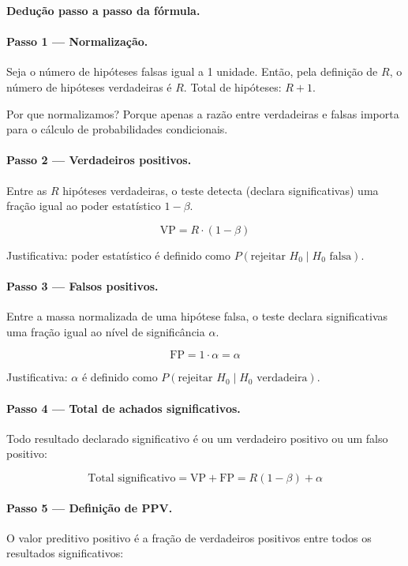\begin{metodo}
\textbf{Dedução passo a passo da fórmula.}

\paragraph{Passo 1 — Normalização.}
Seja o número de hipóteses falsas igual a 1 unidade. Então, pela definição de $R$, o número de hipóteses verdadeiras é $R$. Total de hipóteses: $R + 1$.

Por que normalizamos? Porque apenas a razão entre verdadeiras e falsas importa para o cálculo de probabilidades condicionais.

\paragraph{Passo 2 — Verdadeiros positivos.}
Entre as $R$ hipóteses verdadeiras, o teste detecta (declara significativas) uma fração igual ao poder estatístico $1-\beta$.

\[
\text{VP} = R \cdot (1-\beta)
\]

Justificativa: poder estatístico é definido como $P(\text{rejeitar } H_0 \mid H_0 \text{ falsa})$.

\paragraph{Passo 3 — Falsos positivos.}
Entre a massa normalizada de uma hipótese falsa, o teste declara significativas uma fração igual ao nível de significância $\alpha$.

\[
\text{FP} = 1 \cdot \alpha = \alpha
\]

Justificativa: $\alpha$ é definido como $P(\text{rejeitar } H_0 \mid H_0 \text{ verdadeira})$.

\paragraph{Passo 4 — Total de achados significativos.}
Todo resultado declarado significativo é ou um verdadeiro positivo ou um falso positivo:

\[
\text{Total significativo} = \text{VP} + \text{FP} = R(1-\beta) + \alpha
\]

\paragraph{Passo 5 — Definição de PPV.}
O valor preditivo positivo é a fração de verdadeiros positivos entre todos os resultados significativos:


\end{metodo}

